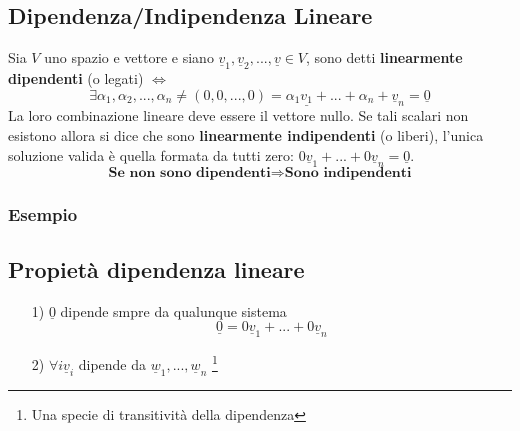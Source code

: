 \subsection{Dipendenza/Indipendenza Lineare}
Sia $V$ uno spazio e vettore e siano $\underline{v}_1, \underline{v}_2, ..., \underline{v} \in V$, sono detti \textbf{linearmente dipendenti} (o legati) $\Leftrightarrow$
$$ \exists \alpha_1, \alpha_2, ..., \alpha_n \neq (0,0,...,0) = \alpha_1\underline{v_1} + ... + \alpha_n+\underline{v}_n = \underline{0}$$
La loro combinazione lineare deve essere il vettore nullo.
Se tali scalari non esistono allora si dice che sono \textbf{linearmente indipendenti} (o liberi), l'unica soluzione valida è quella formata da tutti zero: $0\underline{v}_1+...+0\underline{v}_n = \underline{0}$.
$$ \textbf{Se non sono dipendenti} \Rightarrow \textbf{Sono indipendenti}$$

\subsubsection{Esempio}

\subsection{Propietà dipendenza lineare}
\begin{itemize}
\item[1)] $\underline{0}$ dipende smpre da qualunque sistema
$$ \underline{0} = 0\underline{v}_1+...+0\underline{v}_n $$
\item[2)] $ \forall i \underline{v}_i $ dipende da $ \underline{w}_1,...,\underline{w}_n$ \footnote{Una specie di transitività della dipendenza}
$$  $$
\end{itemize}







